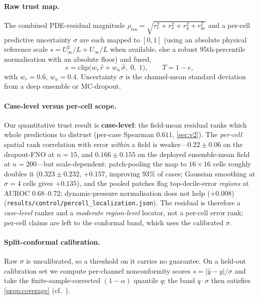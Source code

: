 \paragraph{Raw trust map.} The combined PDE-residual magnitude
$\rho_{\mathrm{res}} = \sqrt{r_c^2 + r_x^2 + r_y^2 + r_{bc}^2}$ and a per-cell predictive
uncertainty $\sigma$ are each mapped to $[0,1]$ (using an absolute physical reference
scale $s = U_\infty^2/L + U_\infty/L$ when available, else a robust 95th-percentile
normalisation with an absolute floor) and fused,
\begin{equation}
e = \mathrm{clip}\!\big(w_r\, \hat{r} + w_u\, \hat{\sigma},\; 0,\; 1\big), \qquad T = 1 - e,
\end{equation}
with $w_r=0.6$, $w_u=0.4$. Uncertainty $\sigma$ is the channel-mean standard deviation
from a deep ensemble or MC-dropout.

\paragraph{Case-level versus per-cell scope.} Our quantitative trust result is
\textbf{case-level}: the field-mean residual ranks which whole predictions to distrust
(per-case Spearman $0.611$, \autoref{sec:v2}). The \emph{per-cell} spatial rank
correlation with error \emph{within} a field is weaker---$0.22{\pm}0.06$ on the
dropout-FNO at $n{=}15$, and $0.166{\pm}0.155$ on the deployed ensemble-mean field at
$n{=}200$---but scale-dependent: patch-pooling the map to $16{\times}16$ cells roughly
doubles it ($0.323{\pm}0.232$, $+0.157$, improving $93\%$ of cases; Gaussian smoothing at
$\sigma{=}4$ cells gives $+0.135$), and the pooled patches flag top-decile-error
\emph{regions} at AUROC $0.68$--$0.72$; dynamic-pressure normalisation does not help
($+0.008$) (\texttt{results/control/percell\_localization.json}). The residual is
therefore a \emph{case-level} ranker and a \emph{moderate region-level} locator, not a
per-cell error rank; per-cell claims are left to the conformal band, which uses the
calibrated $\sigma$.

\paragraph{Split-conformal calibration.} Raw $\sigma$ is uncalibrated, so a threshold on
it carries no guarantee. On a held-out calibration set we compute per-channel
nonconformity scores $s = |\hat{y} - y| / \sigma$ and take the finite-sample-corrected
$(1-\alpha)$ quantile $q$; the band $q\cdot\sigma$ then satisfies
\autoref{prop:coverage} (cf.\ \citealp{ma2024uqno}).

